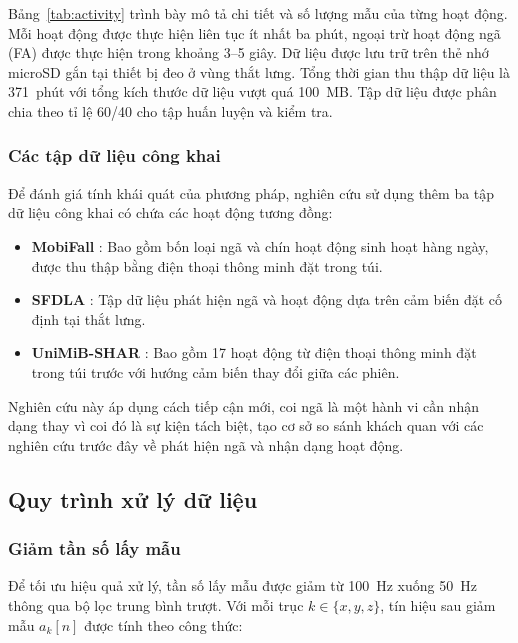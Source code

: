 Bảng~\ref{tab:activity} trình bày mô tả chi tiết và số lượng mẫu của từng hoạt động. Mỗi hoạt động được thực hiện liên tục ít nhất ba phút, ngoại trừ hoạt động ngã (FA) được thực hiện trong khoảng 3--5 giây. Dữ liệu được lưu trữ trên thẻ nhớ microSD gắn tại thiết bị đeo ở vùng thắt lưng. Tổng thời gian thu thập dữ liệu là 371~phút với tổng kích thước dữ liệu vượt quá 100~MB. Tập dữ liệu được phân chia theo tỉ lệ 60/40 cho tập huấn luyện và kiểm tra.

\subsubsection{Các tập dữ liệu công khai}

Để đánh giá tính khái quát của phương pháp, nghiên cứu sử dụng thêm ba tập dữ liệu công khai có chứa các hoạt động tương đồng:

\begin{itemize}
    \item \textbf{MobiFall} \cite{MobiFall2015}: Bao gồm bốn loại ngã và chín hoạt động sinh hoạt hàng ngày, được thu thập bằng điện thoại thông minh đặt trong túi.
    \item \textbf{SFDLA} \cite{SFDLAdataset2016}: Tập dữ liệu phát hiện ngã và hoạt động dựa trên cảm biến đặt cố định tại thắt lưng.
    \item \textbf{UniMiB-SHAR} \cite{UniMiB_SHAR_2017}: Bao gồm 17 hoạt động từ điện thoại thông minh đặt trong túi trước với hướng cảm biến thay đổi giữa các phiên.
\end{itemize}

Nghiên cứu này áp dụng cách tiếp cận mới, coi ngã là một hành vi cần nhận dạng thay vì coi đó là sự kiện tách biệt, tạo cơ sở so sánh khách quan với các nghiên cứu trước đây về phát hiện ngã và nhận dạng hoạt động.

\subsection{Quy trình xử lý dữ liệu}

\subsubsection{Giảm tần số lấy mẫu}

Để tối ưu hiệu quả xử lý, tần số lấy mẫu được giảm từ 100~Hz xuống 50~Hz thông qua bộ lọc trung bình trượt. Với mỗi trục $k \in \{x, y, z\}$, tín hiệu sau giảm mẫu $a_k[n]$ được tính theo công thức:

